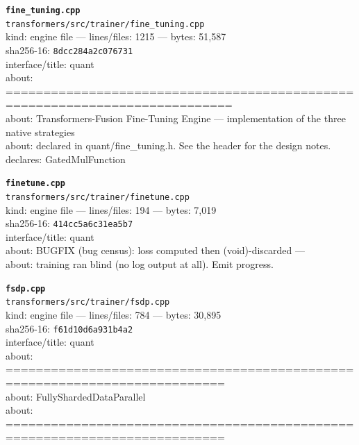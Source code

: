 \noindent\textbf{\texttt{fine\_tuning.cpp}}\\
\texttt{transformers/src/trainer/fine\_tuning.cpp}\\
kind: engine file --- lines/files: 1215 --- bytes: 51,587\\
sha256-16: \texttt{8dcc284a2c076731}\\
interface/title: quant\\
about: ============================================================================\\
about: Transformers-Fusion Fine-Tuning Engine — implementation of the three native strategies\\
about: declared in quant/fine\_tuning.h. See the header for the design notes.\\
declares: GatedMulFunction\\
\vspace*{6.0pt}

\noindent\textbf{\texttt{finetune.cpp}}\\
\texttt{transformers/src/trainer/finetune.cpp}\\
kind: engine file --- lines/files: 194 --- bytes: 7,019\\
sha256-16: \texttt{414cc5a6c31ea5b7}\\
interface/title: quant\\
about: BUGFIX (bug census): loss computed then (void)-discarded —\\
about: training ran blind (no log output at all). Emit progress.\\
\vspace*{6.0pt}

\noindent\textbf{\texttt{fsdp.cpp}}\\
\texttt{transformers/src/trainer/fsdp.cpp}\\
kind: engine file --- lines/files: 784 --- bytes: 30,895\\
sha256-16: \texttt{f61d10d6a931b4a2}\\
interface/title: quant\\
about: ===========================================================================\\
about: FullyShardedDataParallel\\
about: ===========================================================================\\
\vspace*{6.0pt}

